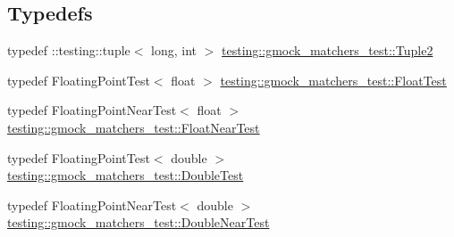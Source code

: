\subsection*{Typedefs}
\begin{DoxyCompactItemize}
\item 
typedef \+::testing\+::tuple$<$ long, int $>$ \hyperlink{namespacetesting_1_1gmock__matchers__test_a8b82c859cd28da9e7f7d4c6091a3165c}{testing\+::gmock\+\_\+matchers\+\_\+test\+::\+Tuple2}
\item 
typedef Floating\+Point\+Test$<$ float $>$ \hyperlink{namespacetesting_1_1gmock__matchers__test_a145329e433869625f9f0e98a0cdfd7b4}{testing\+::gmock\+\_\+matchers\+\_\+test\+::\+Float\+Test}
\item 
typedef Floating\+Point\+Near\+Test$<$ float $>$ \hyperlink{namespacetesting_1_1gmock__matchers__test_a426b51f464dcb48033946e1bf3cc8795}{testing\+::gmock\+\_\+matchers\+\_\+test\+::\+Float\+Near\+Test}
\item 
typedef Floating\+Point\+Test$<$ double $>$ \hyperlink{namespacetesting_1_1gmock__matchers__test_a944cdd366ed240f29ae8e3ebc753ad5c}{testing\+::gmock\+\_\+matchers\+\_\+test\+::\+Double\+Test}
\item 
typedef Floating\+Point\+Near\+Test$<$ double $>$ \hyperlink{namespacetesting_1_1gmock__matchers__test_aea537d0183ccc65b5c49a75d711993c8}{testing\+::gmock\+\_\+matchers\+\_\+test\+::\+Double\+Near\+Test}
\end{DoxyCompactItemize}
